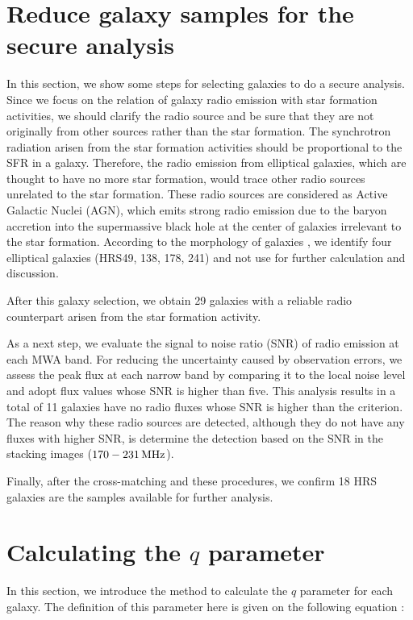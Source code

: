 \section{Reduce galaxy samples for the secure analysis}\label{sec:reducegalaxysamples}

In this section, we show some steps for selecting galaxies to do a secure analysis.
Since we focus on the relation of galaxy radio emission with star formation activities, we should clarify the radio source and be sure that they are not originally from other sources rather than the star formation.
The synchrotron radiation arisen from the star formation activities should be proportional to the SFR in a galaxy.
Therefore, the radio emission from elliptical galaxies, which are thought to have no more star formation, would trace other radio sources unrelated to the star formation.
These radio sources are considered as Active Galactic Nuclei (AGN), which emits strong radio emission due to the baryon accretion into the supermassive black hole at the center of galaxies irrelevant to the star formation.
According to the morphology of galaxies \citep{Cortese2012}, we identify four elliptical galaxies (HRS49, 138, 178, 241) and not use for further calculation and discussion.

After this galaxy selection, we obtain 29 galaxies with a reliable radio counterpart arisen from the star formation activity.

As a next step, we evaluate the signal to noise ratio (SNR) of radio emission at each MWA band.
For reducing the uncertainty caused by observation errors, we assess the peak flux at each narrow band by comparing it to the local noise level and adopt flux values whose SNR is higher than five.
This analysis results in a total of 11 galaxies have no radio fluxes whose SNR is higher than the criterion.
The reason why these radio sources are detected, although they do not have any fluxes with higher SNR, is \citet{Hurley-Walker2017a} determine the detection based on the SNR in the stacking images ($170-231\,\mathrm{MHz}$).

Finally, after the cross-matching and these procedures, we confirm 18 HRS galaxies are the samples available for further analysis.



\section{Calculating the $q$ parameter}\label{subsec:calculatingq}
In this section, we introduce the method to calculate the $q$ parameter for each galaxy.
The definition of this parameter here is given on the following equation \citep[e.g.][]{Helou1985, Bell2003, CalistroRivera2017a}:

